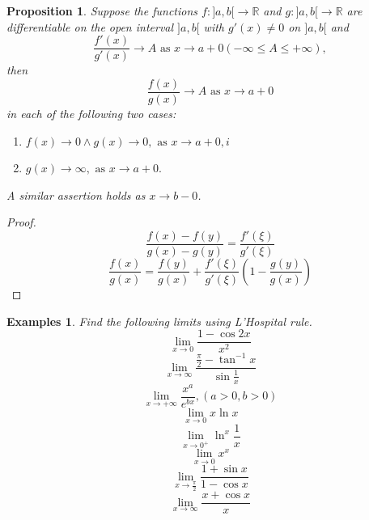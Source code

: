 \documentclass[a4paper,12pt]{article} %
\newtheorem{proposition}{Proposition}[section]
\newtheorem{example}{Examples}
\begin{document}
\begin{proposition}
    \normalfont 
    Suppose the functions $f: ]a,b[ \to \mathbb{R}$ and $g: ]a,b[ \to \mathbb{R}$
    are differentiable on the open interval $]a,b[$ with $g'(x) \ne 0$ on $]a,b[$
    and 
    \[
        \frac{f'(x)}{g'(x)} \to A \text{ as } x \to a+0 (-\infty \le A \le +\infty),
        \]
    then 
    \[
        \frac{f(x)}{g(x)} \to A \text{ as } x \to a+0
        \]
    in each of the following two cases:
    \begin{enumerate}
        \item $\displaystyle f(x) \to 0 \wedge g(x) \to 0, \text{ as } x \to a+0,i$
        \item $\displaystyle g(x) \to \infty, \text{ as } x \to a+0.$
    \end{enumerate}
    A similar assertion holds as $x \to b-0$.
\end{proposition}
\begin{proof}
    \normalfont
    \[
        \frac{f(x) - f(y)}{g(x) - g(y)} = \frac{f'(\xi)}{g'(\xi)}
        \]
    \[
        \frac{f(x)}{g(x)} = \frac{f(y)}{g(x)} + \frac{f'(\xi)}{g'(\xi)}
        \left(1 - \frac{g(y)}{g(x)}\right)
        \]
\end{proof}

\begin{example}
    \normalfont 
    Find the following limits using L'Hospital rule.
    \[
        \lim_{x \to 0}\frac{1 - \cos 2x}{x^2}
        \]
    \[
        \lim_{x \to \infty}\frac{\frac{\pi}{2} - \tan^{-1}x}{\sin \frac{1}{x}}
        \]
    \[
        \lim_{x \to +\infty}\frac{x^a}{e^{bx}},(a>0,b>0)
        \]
    \[
        \lim_{x \to 0}x \ln x
        \]
    \[
        \lim_{x \to 0^+}\ln^x\frac{1}{x}
        \]
    \[
        \lim_{x \to 0}x^x
        \]
    \[
        \lim_{x\to {\frac{\pi}{2}}}\frac{1 + \sin x}{1 - \cos x}
        \]
    \[
        \lim_{x \to \infty} \frac{x + \cos x}{x}
        \]
\end{example}
\end{document}
